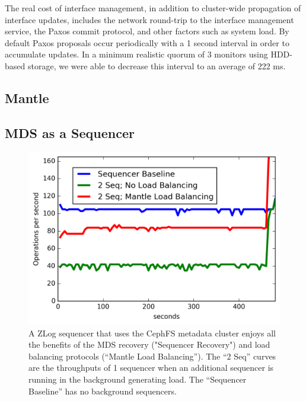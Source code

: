 \documentclass[10pt,twocolumn]{article}
\begin{document}
The real cost of interface management, in addition to cluster-wide propagation
of interface updates, includes the network round-trip to the interface
management service, the Paxos commit protocol, and other factors such as system
load. By default Paxos proposals occur periodically with a 1 second interval in
order to accumulate updates. In a minimum realistic quorum of 3 monitors using
HDD-based storage, we were able to decrease this interval to an average of 222
ms.

\subsection{Mantle}

\subsection{MDS as a Sequencer}
\begin{figure}[h]
\centering
\includegraphics{figures/mantle-seq-thruput.png}
\caption{A ZLog sequencer that uses the CephFS metadata cluster enjoys all the benefits of the MDS recovery ("Sequencer Recovery") and load balancing protocols (``Mantle Load Balancing''). The ``2 Seq'' curves are the throughputs of 1 sequencer when an additional sequencer is running in the background generating load. The ``Sequencer Baseline'' has no background sequencers.}
\label{fig:mantle-seq-thruput.png}
\end{figure}
\end{document}
